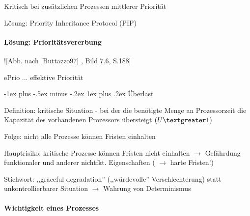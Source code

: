 \documentclass[a4paper]{article}
\makeatletter
\renewcommand{\subsubsection}{\@startsection{subsubsection}{3}{0mm}%
 {-1ex plus -.5ex minus -.2ex}%
 {1ex plus .2ex}%
 {\normalfont\small\bfseries}}
\makeatother
\begin{document}
\begin{multicols}{3}
    \begin{itemize*}
        \item
        Kritisch bei zusätzlichen Prozessen mittlerer Priorität
        \item
        \item
        Lösung: Priority Inheritance Protocol (PIP)
    \end{itemize*}


    \paragraph{Lösung:
        Prioritätsvererbung}

    \begin{itemize*}
        \item
        ![Abb. nach [Buttazzo97] , Bild 7.6, S.188]
        \item
        ePrio ... effektive Priorität
    \end{itemize*}


    \subsubsection{Überlast}

    \begin{itemize*}
        \item
        Definition: kritische Situation - bei der die benötigte Menge an
        Prozessorzeit die Kapazität des vorhandenen Prozessors übersteigt
        $(U\textgreater1)$
        \begin{itemize*}
            \item Folge: nicht alle Prozesse können Fristen einhalten
        \end{itemize*}
        \item
        Hauptrisiko: kritische Prozesse können Fristen nicht einhalten
        $\rightarrow$ Gefährdung funktionaler und anderer
        nichtfkt. Eigenschaften ( $\rightarrow$ harte Fristen!)
        \item
        Stichwort: ,,graceful degradation'' (,,würdevolle'' Verschlechterung)
        statt unkontrollierbarer Situation $\rightarrow$
        Wahrung von Determinismus
    \end{itemize*}


    \paragraph{Wichtigkeit eines
        Prozesses}


\end{multicols}
\end{document}

